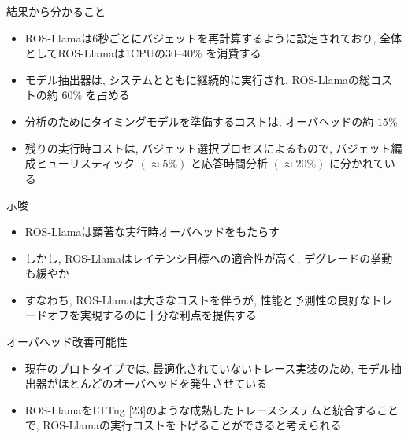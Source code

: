 \begin{frame}{結果から分かること}
    \begin{itemize}
        \item ROS-Llamaは6秒ごとにバジェットを再計算するように設定されており, 全体としてROS-Llamaは1CPUの30--40\% を消費する
        \item モデル抽出器は, システムとともに継続的に実行され, ROS-Llamaの総コストの約 $60 \%$ を占める
        \item 分析のためにタイミングモデルを準備するコストは, オーバヘッドの約 $15 \%$
        \item 残りの実行時コストは, バジェット選択プロセスによるもので, バジェット編成ヒューリスティック $(\approx 5 \%)$ と応答時間分析 $(\approx 20 \%)$ に分かれている
    \end{itemize}
\end{frame}

\begin{frame}{示唆}
    \begin{itemize}
        \item ROS-Llamaは顕著な実行時オーバヘッドをもたらす
        \item しかし, ROS-Llamaはレイテンシ目標への適合性が高く, デグレードの挙動も緩やか
        \item すなわち, ROS-Llamaは大きなコストを伴うが, 性能と予測性の良好なトレードオフを実現するのに十分な利点を提供する
    \end{itemize}
\end{frame}

\begin{frame}{オーバヘッド改善可能性}
    \begin{itemize}
        \item 現在のプロトタイプでは, 最適化されていないトレース実装のため, モデル抽出器がほとんどのオーバヘッドを発生させている
        \item ROS-LlamaをLTTng [23]のような成熟したトレースシステムと統合することで, ROS-Llamaの実行コストを下げることができると考えられる
    \end{itemize}
\end{frame}
